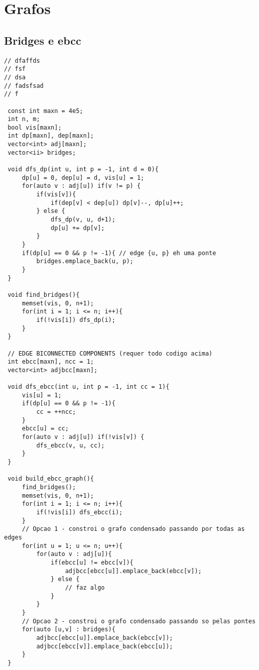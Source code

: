\documentclass[11pt, a4paper, twoside]{article}
\begin{document}
%
%

\section{Grafos}

\subsection{Bridges e ebcc}
\begin{lstlisting}
// dfaffds
// fsf
// dsa
// fadsfsad
// f

 const int maxn = 4e5;
 int n, m;
 bool vis[maxn];
 int dp[maxn], dep[maxn];
 vector<int> adj[maxn];
 vector<ii> bridges;
 
 void dfs_dp(int u, int p = -1, int d = 0){
     dp[u] = 0, dep[u] = d, vis[u] = 1;
     for(auto v : adj[u]) if(v != p) {
         if(vis[v]){
             if(dep[v] < dep[u]) dp[v]--, dp[u]++;
         } else {
             dfs_dp(v, u, d+1);
             dp[u] += dp[v];
         }
     }
     if(dp[u] == 0 && p != -1){ // edge {u, p} eh uma ponte
         bridges.emplace_back(u, p);
     }
 }
 
 void find_bridges(){
     memset(vis, 0, n+1);
     for(int i = 1; i <= n; i++){
         if(!vis[i]) dfs_dp(i);
     }
 }
 
 // EDGE BICONNECTED COMPONENTS (requer todo codigo acima)
 int ebcc[maxn], ncc = 1;
 vector<int> adjbcc[maxn];
 
 void dfs_ebcc(int u, int p = -1, int cc = 1){
     vis[u] = 1;
     if(dp[u] == 0 && p != -1){
         cc = ++ncc;
     }
     ebcc[u] = cc;
     for(auto v : adj[u]) if(!vis[v]) {
         dfs_ebcc(v, u, cc);
     }
 }
 
 void build_ebcc_graph(){
     find_bridges();
     memset(vis, 0, n+1);
     for(int i = 1; i <= n; i++){
         if(!vis[i]) dfs_ebcc(i);
     }
     // Opcao 1 - constroi o grafo condensado passando por todas as edges
     for(int u = 1; u <= n; u++){
         for(auto v : adj[u]){
             if(ebcc[u] != ebcc[v]){
                 adjbcc[ebcc[u]].emplace_back(ebcc[v]);
             } else {
                 // faz algo
             }
         }
     }
     // Opcao 2 - constroi o grafo condensado passando so pelas pontes
     for(auto [u,v] : bridges){
         adjbcc[ebcc[u]].emplace_back(ebcc[v]);
         adjbcc[ebcc[v]].emplace_back(ebcc[u]);
     }
 }
\end{lstlisting}
\end{document}
